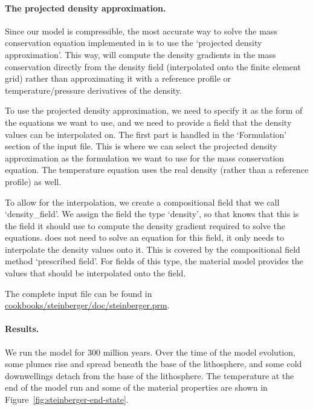 
\paragraph{The projected density approximation.}
Since our model is compressible, the most accurate way to solve the mass 
conservation equation implemented in \aspect{} is to use the `projected density
approximation'. This way, \aspect{} will compute the density gradients in the 
mass conservation directly from the density field (interpolated onto the 
finite element grid) rather than approximating it with a reference profile 
or temperature/pressure derivatives of the density. 

To use the projected density approximation, we need to specify it as the form of the equations we want to use, and we need to provide a field that the density values can be interpolated on. 
The first part is handled in the `Formulation' section of the input file. This is where we can select 
the projected density approximation as the formulation we want to use for the mass conservation equation. 
The temperature equation uses the real density (rather than a reference profile) as well. 

To allow for the interpolation, we create a compositional field that we call `density\_field'. 
We assign the field the type `density', so that \aspect{} knows that this is the field it should use to compute the density gradient required to solve the equations. \aspect{} does not need to solve an 
equation for this field, it only needs to interpolate the density values onto it. 
This is covered by the compositional field method `prescribed field'. 
For fields of this type, the material model provides the values that should be 
interpolated onto the field.


The complete input file can be found in \url{cookbooks/steinberger/doc/steinberger.prm}. 

\paragraph{Results.} We run the model for 300 million years. Over the time of the model evolution, some plumes rise and spread beneath the base of the lithosphere, and some cold downwellings detach from the base of the lithosphere. The temperature at the end of the model run and some of the material properties are shown in Figure~\ref{fig:steinberger-end-state}. 

